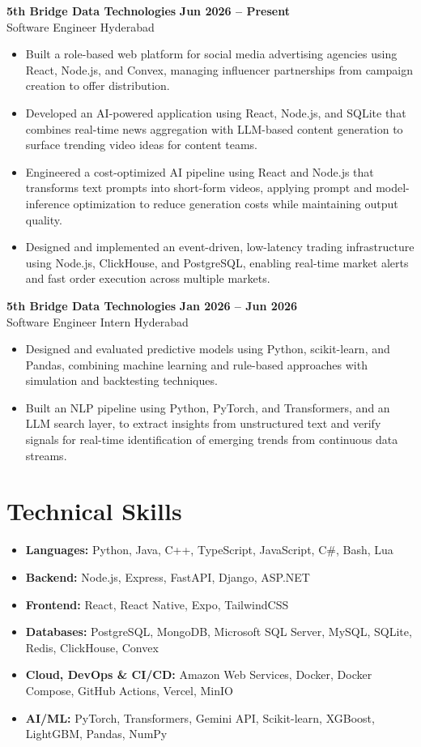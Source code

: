 \documentclass[a4paper,11pt]{article}
\newcommand{\resumeItem}[1]{\item \small{#1}}
\newcommand{\resumeSubheading}[4]{%
  \textbf{#1} \hfill \textbf{#2} \\
{#3} \hfill {#4}
}
\newcommand{\resumeSubHeadingListStart}{\begin{itemize}}
\newcommand{\resumeSubHeadingListEnd}{\end{itemize}}
\begin{document}
\resumeSubheading
{5th Bridge Data Technologies}{Jun 2026 -- Present}
{Software Engineer}{Hyderabad}
\resumeSubHeadingListStart
\resumeItem{Built a role-based web platform for social media advertising agencies using React, Node.js, and Convex, managing influencer partnerships from campaign creation to offer distribution.}
\resumeItem{Developed an AI-powered application using React, Node.js, and SQLite that combines real-time news aggregation with LLM-based content generation to surface trending video ideas for content teams.}
\resumeItem{Engineered a cost-optimized AI pipeline using React and Node.js that transforms text prompts into short-form videos, applying prompt and model-inference optimization to reduce generation costs while maintaining output quality.}
\resumeItem{Designed and implemented an event-driven, low-latency trading infrastructure using Node.js, ClickHouse, and PostgreSQL, enabling real-time market alerts and fast order execution across multiple markets.}
\resumeSubHeadingListEnd

\resumeSubheading
{5th Bridge Data Technologies}{Jan 2026 -- Jun 2026}
{Software Engineer Intern}{Hyderabad}
\resumeSubHeadingListStart
\resumeItem{Designed and evaluated predictive models using Python, scikit-learn, and Pandas, combining machine learning and rule-based approaches with simulation and backtesting techniques.}
\resumeItem{Built an NLP pipeline using Python, PyTorch, and Transformers, and an LLM search layer, to extract insights from unstructured text and verify signals for real-time identification of emerging trends from continuous data streams.}
\resumeSubHeadingListEnd


\section*{Technical Skills}
\begin{itemize}
\item \textbf{Languages:} Python, Java, C++, TypeScript, JavaScript, C\#, Bash, Lua
\item \textbf{Backend:} Node.js, Express, FastAPI, Django, ASP.NET
\item \textbf{Frontend:} React, React Native, Expo, TailwindCSS
\item \textbf{Databases:} PostgreSQL, MongoDB, Microsoft SQL Server, MySQL, SQLite, Redis, ClickHouse, Convex
\item \textbf{Cloud, DevOps \& CI/CD:} Amazon Web Services, Docker, Docker Compose, GitHub Actions, Vercel, MinIO
\item \textbf{AI/ML:} PyTorch, Transformers, Gemini API, Scikit-learn, XGBoost, LightGBM, Pandas, NumPy
\end{itemize}
\vspace{-0.2em}
\end{document}
